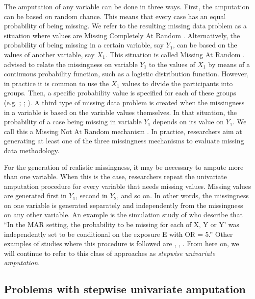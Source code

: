 \documentclass[11pt,a4paper]{article}
\begin{document}
The amputation of any variable can be done in three ways. First, the amputation can be based on random chance. This means that every case has an equal probability of being missing. We refer to the resulting missing data problem as a situation where values are Missing Completely At Random \citep[i.e. MCAR,][]{Rubin1976}. Alternatively, the probability of being missing in a certain variable, say $Y_1$, can be based on the values of another variable, say $X_1$. This situation is called Missing At Random \citep[i.e. MAR,][]{Rubin1976}. \citet[][pp. 63, 64]{Stef2012} advised to relate the missingness on variable $Y_1$ to the values of $X_1$ by means of a continuous probability function, such as a logistic distribution function. However, in practice it is common to use the $X_1$ values to divide the participants into groups. Then, a specific probability value is specified for each of these groups (e.g. \citealp{Kontopantelis2017}; \citealp{Allison2000}; \citealp{Yuan2012}). A third type of missing data problem is created when the missingness in a variable is based on the variable values themselves. In that situation, the probability of a case being missing in variable $Y_1$ depends on its value on $Y_1$. We call this a Missing Not At Random mechanism \citep[i.e. MNAR,][pp. 31, 32]{Rubin1987, Stef2012}. In practice, researchers aim at generating at least one of the three missingness mechanisms to evaluate missing data methodology.

For the generation of realistic missingness, it may be necessary to ampute more than one variable. When this is the case, researchers repeat the univariate amputation procedure for every variable that needs missing values. Missing values are generated first in $Y_1$, second in $Y_2$, and so on. In other words, the missingness on one variable is generated separately and independently from the missingness on any other variable. An example is the simulation study of \citet[][p. 3]{Kontopantelis2017} who describe that ``In the MAR setting, the probability to be missing for each of X, Y or Y' was independently set to be conditional on the exposure E with OR = 5.'' Other examples of studies where this procedure is followed are \citet{Abrahantes2011}, \citet{Kalaycioglu2016}, \citet{Pastor2003}. From here on, we will continue to refer to this class of approaches as \textit{stepwise univariate amputation}.

\subsection{\normalsize Problems with stepwise univariate amputation}\label{problems}
\end{document}
